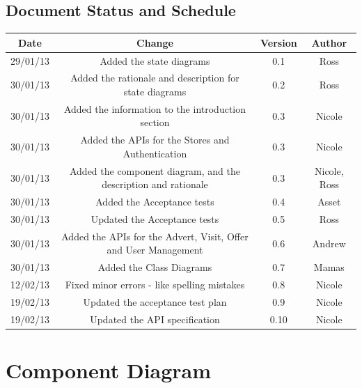 \documentclass{l3deliverable}
\begin{document}
\subsection{Document Status and Schedule}

\begin{center}{
\begin{tabular}{|c|c|c|c|}
\hline \textbf{Date} &\textbf{ Change} & \textbf{Version} &\textbf{Author}\\ 
\hline 29/01/13 & Added the state diagrams & 0.1 & Ross\\
\hline 30/01/13 & Added the rationale and description for state diagrams & 0.2 & Ross\\
\hline 30/01/13 & Added the information to the introduction section & 0.3 & Nicole\\ 
\hline 30/01/13 & Added the APIs for the Stores and Authentication & 0.3 & Nicole\\
\hline 30/01/13 & Added the component diagram, and the description and rationale & 0.3 & Nicole, Ross\\
\hline 30/01/13 & Added the Acceptance tests & 0.4 & Asset\\
\hline 30/01/13 & Updated the Acceptance tests & 0.5 & Ross\\
\hline 30/01/13 & Added the APIs for the Advert, Visit, Offer and User Management & 0.6 & Andrew\\
\hline 30/01/13 & Added the Class Diagrams & 0.7 & Mamas\\
\hline 12/02/13 & Fixed minor errors - like spelling mistakes & 0.8 & Nicole\\
\hline 19/02/13 & Updated the acceptance test plan & 0.9 & Nicole\\
\hline 19/02/13 & Updated the API specification & 0.10 & Nicole\\
\hline 
\end{tabular} }
\end{center}


\section{Component Diagram}
\end{document}
